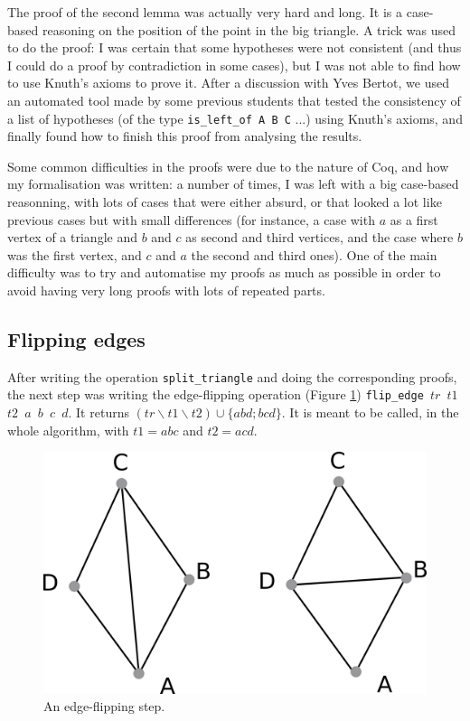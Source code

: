 \documentclass[a4paper,10pt]{article}
\begin{document}
The proof of the second lemma was actually very hard and long. It is a case-based reasoning on the position of the point in the big triangle. A trick was used to do the proof: I was certain that some hypotheses were not consistent (and thus I could do a proof by contradiction in some cases), but I was not able to find how to use Knuth's axioms to prove it. After a discussion with Yves Bertot, we used an automated tool made by some previous students that tested the consistency of a list of hypotheses (of the type {\tt is\_left\_of A B C} ...) using Knuth's axioms, and finally found how to finish this proof from analysing the results.

Some common difficulties in the proofs were due to the nature of {\sc Coq}, and how my formalisation was written: a number of times, I was left with a big case-based reasonning, with lots of cases that were either absurd, or that looked a lot like previous cases but with small differences (for instance, a case with $a$ as a first vertex of a triangle and $b$ and $c$ as second and third vertices, and the case where $b$ was the first vertex, and $c$ and $a$ the second and third ones). One of the main difficulty was to try and automatise my proofs as much as possible in order to avoid having very long proofs with lots of repeated parts.


  
\subsection{Flipping edges}
After writing the operation {\tt split\_triangle} and doing the corresponding proofs, the next step was writing the edge-flipping operation (Figure \ref{flip_edge}) {\tt flip\_edge $tr$ $t1$ $t2$ $a$ $b$ $c$ $d$}.
It returns $(tr \smallsetminus t1 \smallsetminus t2) \cup \{abd;bcd\}$. It is meant to be called, in the whole algorithm, with $t1 = abc$ and $t2=acd$.

\begin{figure}
  \centering
  \includegraphics[scale=2]{flip_edge}
    \caption{\label{flip_edge} An edge-flipping step.}
\end{figure}
\end{document}
